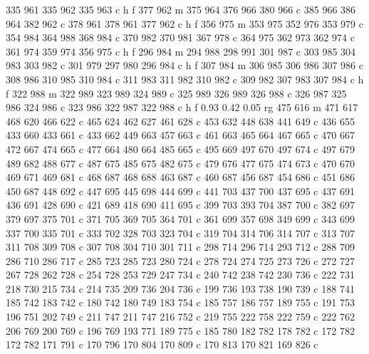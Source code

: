 {{        335 961 335 962 335 963 c
        h f
        377 962 m
        375 964 376 966 380 966 c
        385 966 386 964 382 962 c
        378 961 378 961 377 962 c
        h f
        356 975 m
        353 975 352 976 353 979 c
        354 984 364 988 368 984 c
        370 982 370 981 367 978 c
        364 975 362 973 362 974 c
        361 974 359 974 356 975 c
        h f
        296 984 m
        294 988 298 991 301 987 c
        303 985 304 983 303 982 c
        301 979 297 980 296 984 c
        h f
        307 984 m
        306 985 306 986 307 986 c
        308 986 310 985 310 984 c
        311 983 311 982 310 982 c
        309 982 307 983 307 984 c
        h f
        322 988 m
        322 989 323 989 324 989 c
        325 989 326 989 326 988 c
        326 987 325 986 324 986 c
        323 986 322 987 322 988 c
        h f
        0.93 0.42 0.05 rg
        475 616 m
        471 617 468 620 466 622 c
        465 624 462 627 461 628 c
        453 632 448 638 441 649 c
        436 655 433 660 433 661 c
        433 662 449 663 457 663 c
        461 663 465 664 467 665 c
        470 667 472 667 474 665 c
        477 664 480 664 485 665 c
        495 669 497 670 497 674 c
        497 679 489 682 488 677 c
        487 675 485 675 482 675 c
        479 676 477 675 474 673 c
        470 670 469 671 469 681 c
        468 687 468 688 463 687 c
        460 687 456 687 454 686 c
        451 686 450 687 448 692 c
        447 695 445 698 444 699 c
        441 703 437 700 437 695 c
        437 691 436 691 428 690 c
        421 689 418 690 411 695 c
        399 703 393 704 387 700 c
        382 697 379 697 375 701 c
        371 705 369 705 364 701 c
        361 699 357 698 349 699 c
        343 699 337 700 335 701 c
        333 702 328 703 323 704 c
        319 704 314 706 314 707 c
        313 707 311 708 309 708 c
        307 708 304 710 301 711 c
        298 714 296 714 293 712 c
        288 709 286 710 286 717 c
        285 723 285 723 280 724 c
        278 724 274 725 273 726 c
        272 727 267 728 262 728 c
        254 728 253 729 247 734 c
        240 742 238 742 230 736 c
        222 731 218 730 215 734 c
        214 735 209 736 204 736 c
        199 736 193 738 190 739 c
        188 741 185 742 183 742 c
        180 742 180 749 183 754 c
        185 757 186 757 189 755 c
        191 753 196 751 202 749 c
        211 747 211 747 216 752 c
        219 755 222 758 222 759 c
        222 762 206 769 200 769 c
        196 769 193 771 189 775 c
        185 780 182 782 178 782 c
        172 782 172 782 171 791 c
        170 796 170 804 170 809 c
        170 813 170 821 169 826 c
}}
